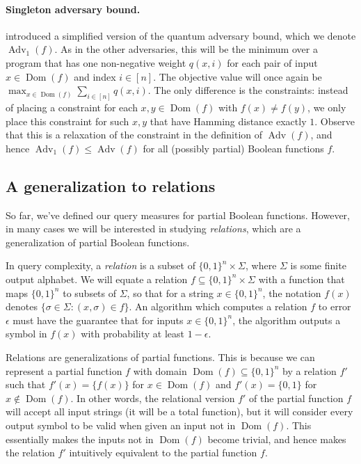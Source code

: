 \documentclass[10pt,a4paper]{article}
\theoremstyle{definition}
\DeclareMathOperator{\Dom}{Dom}
\newcommand{\B}{\{0,1\}}
\renewcommand{\>}{\rangle}
\newcommand{\<}{\langle}
\DeclareMathOperator{\Adv}{Adv}
\begin{document}
\paragraph{Singleton adversary bound.}
\cite{ABK+20} introduced a simplified version
of the quantum adversary bound, which we denote
$\Adv_1(f)$. As in the other adversaries,
this will be the minimum over a program that has
one non-negative weight $q(x,i)$ for each pair
of input $x\in\Dom(f)$ and index $i\in[n]$.
The objective value will once again be
$\max_{x\in\Dom(f)}\sum_{i\in[n]} q(x,i)$.
The only difference is the constraints:
instead of placing a constraint
for each $x,y\in\Dom(f)$ with $f(x)\ne f(y)$,
we only place this constraint for such $x,y$
that have Hamming distance exactly $1$.
Observe that this is a relaxation
of the constraint in the definition of $\Adv(f)$,
and hence $\Adv_1(f)\le \Adv(f)$ for all (possibly partial)
Boolean functions $f$.

\subsection{A generalization to relations}

So far, we've defined our query measures for partial
Boolean functions. However, in many cases we will be interested
in studying \emph{relations}, which are a generalization
of partial Boolean functions.

In query complexity, a \emph{relation} is a subset
of $\B^n\times \Sigma$, where $\Sigma$ is some finite
output alphabet. We will equate a relation
$f\subseteq \B^n\times\Sigma$ with a function
that maps $\B^n$ to subsets of $\Sigma$, so that
for a string $x\in\B^n$, the notation $f(x)$ denotes
$\{\sigma\in\Sigma:(x,\sigma)\in f\}$.
An algorithm which computes a relation $f$ to error
$\epsilon$ must have the guarantee that for inputs $x\in\B^n$,
the algorithm outputs a symbol in $f(x)$ with probability
at least $1-\epsilon$.

Relations are generalizations of partial functions.
This is because we can represent a partial function
$f$ with domain $\Dom(f)\subseteq\B^n$ by a relation
$f'$ such that $f'(x)=\{f(x)\}$ for $x\in\Dom(f)$
and $f'(x)=\{0,1\}$ for $x\notin\Dom(f)$. In other words,
the relational version $f'$ of the partial function $f$
will accept all input strings (it will be a total function),
but it will consider every output symbol to be valid
when given an input not in $\Dom(f)$. This essentially
makes the inputs not in $\Dom(f)$ become trivial, and hence
makes the relation $f'$ intuitively equivalent to the partial
function $f$.
\end{document}
